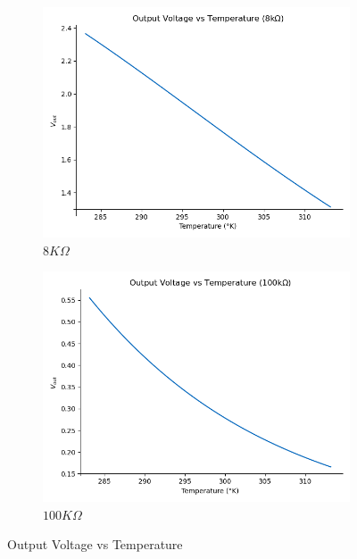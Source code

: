 \documentclass[12pt]{article}
\begin{document}
    \begin{figure}[h]
        \centering
        \begin{subfigure}{0.45\textwidth}
            \centering
            \includegraphics[width=\textwidth]{images/VoutPorTemp.png}
            \caption{ $8K\Omega$ }
        \end{subfigure}\hfill
        \begin{subfigure}{0.45\textwidth}
            \centering
            \includegraphics[width=\textwidth]{images/VoutPorTemp100k.png}
            \caption{$100K\Omega$}
        \end{subfigure}
        \caption{Output Voltage vs Temperature}
    \end{figure}
\end{document}
